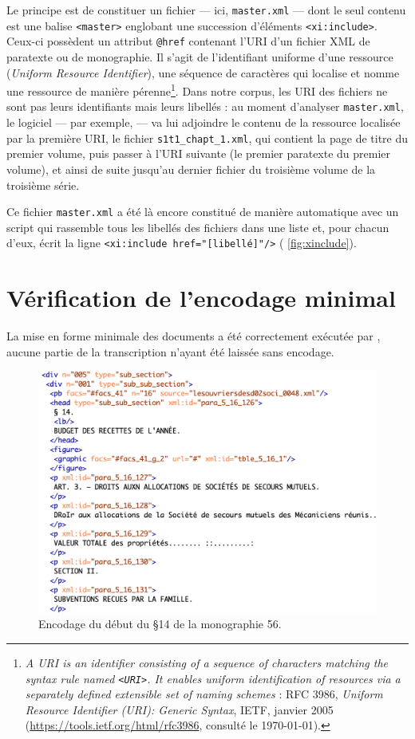 Le principe est de constituer un fichier --- ici, \texttt{master.xml} --- dont le seul contenu est une balise \texttt{<master>} englobant une succession d'éléments \texttt{<xi:include>}. Ceux-ci possèdent un attribut \texttt{@href} contenant l'URI d'un fichier XML de paratexte ou de monographie. Il s'agit de l'identifiant uniforme d'une ressource (\textit{Uniform Resource Identifier}), \cad{} une séquence de caractères qui localise et nomme une ressource de manière pérenne\footnote{\og \textit{A URI is an identifier consisting of a sequence of characters matching the syntax rule named \texttt{<URI>}. It enables uniform identification of resources via a separately defined extensible set of naming schemes} \fg{} : RFC 3986, \textit{Uniform Resource Identifier (URI): Generic Syntax}, IETF, janvier 2005 (\url{https://tools.ietf.org/html/rfc3986}, consulté le \today).}. Dans notre corpus, les URI des fichiers ne sont pas leurs identifiants mais leurs libellés : au moment d'analyser \texttt{master.xml}, le logiciel --- par exemple, \oxygen{} --- va lui adjoindre le contenu de la ressource localisée par la première URI, \cad{} le fichier \texttt{s1t1\_chapt\_1.xml}, qui contient la page de titre du premier volume, puis passer à l'URI suivante (le premier paratexte du premier volume), et ainsi de suite jusqu'au dernier fichier du troisième volume de la troisième série.

Ce fichier \texttt{master.xml} a été là encore constitué de manière automatique avec un script qui rassemble tous les libellés des fichiers dans une liste et, pour chacun d'eux, écrit la ligne \texttt{<xi:include href="[libellé]"/>} (\fig{} \ref{fig:xinclude}).

\section{Vérification de l'encodage minimal}

La mise en forme minimale des documents a été correctement exécutée par \lse, aucune partie de la transcription n'ayant été laissée sans encodage.

\begin{figure}[ht]
    \centering
    \includegraphics[width=15cm]{img/table_s2t2_chapt_5.png}
    \caption{Encodage du début du §14 de la monographie 56.}
    \label{fig:tableodm56xml}
\end{figure}

